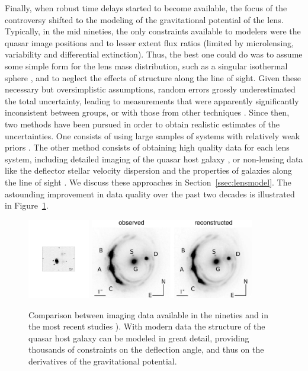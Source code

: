 Finally, when robust time delays started to become available, the
focus of the controversy shifted to the modeling of the gravitational
potential of the lens. Typically, in the mid nineties, the only
constraints available to modelers were the quasar image positions and
to lesser extent flux ratios (limited by microlensing, variability and
differential extinction). Thus, the best one could do was to assume
some simple form for the lens mass distribution, such as a singular isothermal
sphere \citep{K+F99},
and to neglect the
effects of structure along the line of sight. Given these necessary
but oversimplistic assumptions, random errors grossly underestimated
the total uncertainty, leading to measurements that were apparently
significantly inconsistent
between groups, or with those from other techniques
\citep{K+S04}. Since then, two methods have been pursued in order to
obtain realistic estimates of the uncertainties. One consists of using
large samples of systems with relatively weak priors
\citep{Ogu07b}. The other method consists of obtaining high quality data for
each lens system, including detailed imaging of the quasar host galaxy
\citep{Keeton:2000p241,WBB04,Suy++06}, or non-lensing data like the deflector
stellar velocity dispersion \citep{T+K02b} and the properties of
galaxies along the line of sight \citep{K+Z04,Suy++10}. We discuss
these approaches in Section~\ref{ssec:lensmodel}. The astounding
improvement in data quality over the past two decades is illustrated
in Figure~\ref{fig:oldvsmodernimage}.

\begin{figure}
\includegraphics[height=3.5cm]{figures/Schechter97_fg1.pdf}
\includegraphics[height=3.5cm]{figures/Suyu14_fig1.jpg}
\caption{Comparison between imaging data available in the nineties
\citep[eft panel, from][]{Sch++97} and in the most recent studies
\citep[middle and right panels, from][]{Suy++14}). With modern data the
structure of the quasar host galaxy can be modeled in great detail,
providing thousands of constraints on the deflection angle, and thus on
the derivatives of the gravitational potential.}
\label{fig:oldvsmodernimage}
\end{figure}

